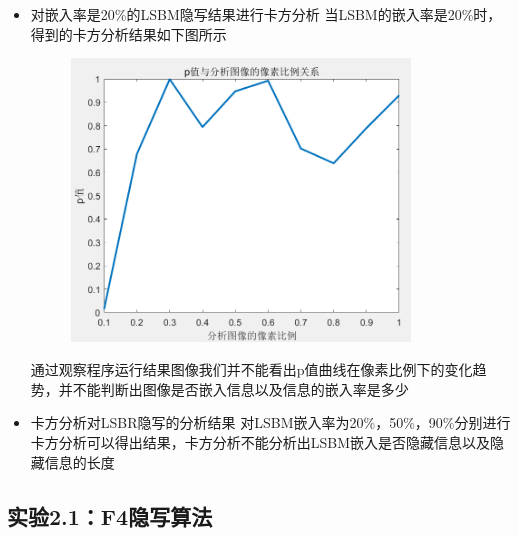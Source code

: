 \documentclass[a4paper,11pt,UTF8]{ctexart}
\newcommand{\bottomcaption}{%
\setlength{\abovecaptionskip}{6pt}%
\setlength{\belowcaptionskip}{6pt}%
\caption}
\newcommand{\xiaowuhao}{\fontsize{9pt}{\baselineskip}\selectfont}   %
\begin{document}
\begin{itemize}
        \item 对嵌入率是20\%的LSBM隐写结果进行卡方分析
        当LSBM的嵌入率是20\%时，得到的卡方分析结果如下图所示
        \begin{figure}[H]
          \centering
          \includegraphics[width=9cm]{k2_LSBM_20.png}
          \bottomcaption{\xiaowuhao{对嵌入率为20\%的LSBM隐写图像卡方分析结果}}
        \end{figure}
        通过观察程序运行结果图像我们并不能看出p值曲线在像素比例下的变化趋势，并不能判断出图像是否嵌入信息以及信息的嵌入率是多少

        \item 卡方分析对LSBR隐写的分析结果
        对LSBM嵌入率为20\%，50\%，90\%分别进行卡方分析可以得出结果，卡方分析不能分析出LSBM嵌入是否隐藏信息以及隐藏信息的长度
      \end{itemize}

  \subsection{实验2.1：F4隐写算法}
\end{document}
